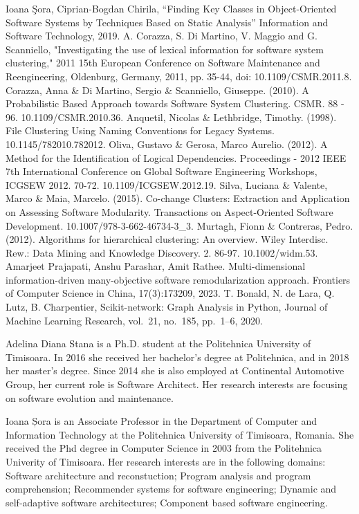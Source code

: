 \documentclass{ieeeaccess}
\begin{document}
\begin{thebibliography}{00}
 Ioana Şora, Ciprian-Bogdan Chirila, “Finding Key Classes in Object-Oriented Software Systems by Techniques Based on Static Analysis”  Information and Software Technology, 2019.
 A. Corazza, S. Di Martino, V. Maggio and G. Scanniello, "Investigating the use of lexical information for software system clustering," 2011 15th European Conference on Software Maintenance and Reengineering, Oldenburg, Germany, 2011, pp. 35-44, doi: 10.1109/CSMR.2011.8.
 Corazza, Anna \& Di Martino, Sergio \& Scanniello, Giuseppe. (2010). A Probabilistic Based Approach towards Software System Clustering. CSMR. 88 - 96. 10.1109/CSMR.2010.36. 
 Anquetil, Nicolas \& Lethbridge, Timothy. (1998). File Clustering Using Naming Conventions for Legacy Systems. 10.1145/782010.782012. 
 Oliva, Gustavo \& Gerosa, Marco Aurelio. (2012). A Method for the Identification of Logical Dependencies. Proceedings - 2012 IEEE 7th International Conference on Global Software Engineering Workshops, ICGSEW 2012. 70-72. 10.1109/ICGSEW.2012.19. 
 Silva, Luciana \& Valente, Marco \& Maia, Marcelo. (2015). Co-change Clusters: Extraction and Application on Assessing Software Modularity. Transactions on Aspect-Oriented Software Development. 10.1007/978-3-662-46734-3\_3. 
 Murtagh, Fionn \& Contreras, Pedro. (2012). Algorithms for hierarchical clustering: An overview. Wiley Interdisc. Rew.: Data Mining and Knowledge Discovery. 2. 86-97. 10.1002/widm.53. 
 Amarjeet Prajapati, Anshu Parashar, Amit Rathee. Multi-dimensional information-driven many-objective software remodularization approach. Frontiers of Computer Science in China, 17(3):173209, 2023.
 T. Bonald, N. de Lara, Q. Lutz, B. Charpentier, Scikit-network: Graph Analysis in Python, Journal of Machine Learning Research, vol.~21, no.~185, pp.~1--6, 2020. 



\end{thebibliography}

\begin{IEEEbiographynophoto}{Adelina Diana Stana} is a Ph.D. student at the Politehnica University of Timisoara.
In 2016 she received her bachelor’s degree at Politehnica, and in 2018 her master’s degree. Since 2014 she is also employed at Continental Automotive Group, her current role is Software Architect. Her research interests are focusing on software evolution and maintenance.
\end{IEEEbiographynophoto}

\begin{IEEEbiographynophoto}{Ioana Șora} is an Associate Professor in the Department of Computer and Information Technology at the Politehnica University of Timisoara, Romania. She received the Phd degree in Computer Science in 2003 from the Politehnica Univerity of Timisoara.
Her research interests are in the following domains: Software architecture and reconstuction; Program analysis and program comprehension; Recommender systems for software engineering; Dynamic and self-adaptive software architectures; Component based software engineering.
\end{IEEEbiographynophoto}

\EOD
\end{document}
